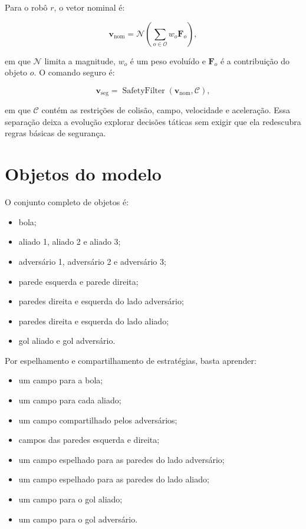 \documentclass[12pt,a4paper]{article}
\newcommand{\vect}[1]{\boldsymbol{#1}}
\begin{document}
Para o rob\^o $r$, o vetor nominal \'e:

\begin{equation}
  \vect{v}_{\mathrm{nom}}
  =\mathcal{N}\left(\sum_{o\in\mathcal{O}}w_o\vect{F}_o\right),
  \label{eq:nominal}
\end{equation}

em que $\mathcal{N}$ limita a magnitude, $w_o$ \'e um peso evolu\'ido e $\vect{F}_o$ \'e a contribui\c{c}\~ao do objeto $o$. O comando seguro \'e:

\begin{equation}
  \vect{v}_{\mathrm{seg}}
  =\operatorname{SafetyFilter}(\vect{v}_{\mathrm{nom}},\mathcal{C}),
\end{equation}

em que $\mathcal{C}$ cont\'em as restri\c{c}\~oes de colis\~ao, campo, velocidade e acelera\c{c}\~ao. Essa separa\c{c}\~ao deixa a evolu\c{c}\~ao explorar decis\~oes t\'aticas sem exigir que ela redescubra regras b\'asicas de seguran\c{c}a.

\section{Objetos do modelo}

O conjunto completo de objetos \'e:

\begin{itemize}
  \item bola;
  \item aliado 1, aliado 2 e aliado 3;
  \item advers\'ario 1, advers\'ario 2 e advers\'ario 3;
  \item parede esquerda e parede direita;
  \item paredes direita e esquerda do lado advers\'ario;
  \item paredes direita e esquerda do lado aliado;
  \item gol aliado e gol advers\'ario.
\end{itemize}

Por espelhamento e compartilhamento de estrat\'egias, basta aprender:

\begin{itemize}
  \item um campo para a bola;
  \item um campo para cada aliado;
  \item um campo compartilhado pelos advers\'arios;
  \item campos das paredes esquerda e direita;
  \item um campo espelhado para as paredes do lado advers\'ario;
  \item um campo espelhado para as paredes do lado aliado;
  \item um campo para o gol aliado;
  \item um campo para o gol advers\'ario.
\end{itemize}
\end{document}
